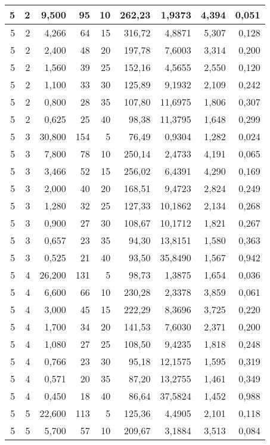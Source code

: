 \begin{tabular}{rrrrrrrrr}
5 & 2 & 9,500 & 95 & 10 & 262,23 & 1,9373 & 4,394 & 0,051 \\ \hline
5 & 2 & 4,266 & 64 & 15 & 316,72 & 4,8871 & 5,307 & 0,128 \\ \hline
5 & 2 & 2,400 & 48 & 20 & 197,78 & 7,6003 & 3,314 & 0,200 \\ \hline
5 & 2 & 1,560 & 39 & 25 & 152,16 & 4,5655 & 2,550 & 0,120 \\ \hline
5 & 2 & 1,100 & 33 & 30 & 125,89 & 9,1932 & 2,109 & 0,242 \\ \hline
5 & 2 & 0,800 & 28 & 35 & 107,80 & 11,6975 & 1,806 & 0,307 \\ \hline
5 & 2 & 0,625 & 25 & 40 & 98,38 & 11,3795 & 1,648 & 0,299 \\ \hline
5 & 3 & 30,800 & 154 & 5 & 76,49 & 0,9304 & 1,282 & 0,024 \\ \hline
5 & 3 & 7,800 & 78 & 10 & 250,14 & 2,4733 & 4,191 & 0,065 \\ \hline
5 & 3 & 3,466 & 52 & 15 & 256,02 & 6,4391 & 4,290 & 0,169 \\ \hline
5 & 3 & 2,000 & 40 & 20 & 168,51 & 9,4723 & 2,824 & 0,249 \\ \hline
5 & 3 & 1,280 & 32 & 25 & 127,33 & 10,1862 & 2,134 & 0,268 \\ \hline
5 & 3 & 0,900 & 27 & 30 & 108,67 & 10,1712 & 1,821 & 0,267 \\ \hline
5 & 3 & 0,657 & 23 & 35 & 94,30 & 13,8151 & 1,580 & 0,363 \\ \hline
5 & 3 & 0,525 & 21 & 40 & 93,50 & 35,8490 & 1,567 & 0,942 \\ \hline
5 & 4 & 26,200 & 131 & 5 & 98,73 & 1,3875 & 1,654 & 0,036 \\ \hline
5 & 4 & 6,600 & 66 & 10 & 230,28 & 2,3378 & 3,859 & 0,061 \\ \hline
5 & 4 & 3,000 & 45 & 15 & 222,29 & 8,3696 & 3,725 & 0,220 \\ \hline
5 & 4 & 1,700 & 34 & 20 & 141,53 & 7,6030 & 2,371 & 0,200 \\ \hline
5 & 4 & 1,080 & 27 & 25 & 108,50 & 9,4235 & 1,818 & 0,248 \\ \hline
5 & 4 & 0,766 & 23 & 30 & 95,18 & 12,1575 & 1,595 & 0,319 \\ \hline
5 & 4 & 0,571 & 20 & 35 & 87,20 & 13,2755 & 1,461 & 0,349 \\ \hline
5 & 4 & 0,450 & 18 & 40 & 86,64 & 37,5824 & 1,452 & 0,988 \\ \hline
5 & 5 & 22,600 & 113 & 5 & 125,36 & 4,4905 & 2,101 & 0,118 \\ \hline
5 & 5 & 5,700 & 57 & 10 & 209,67 & 3,1884 & 3,513 & 0,084 \\ \hline

\end{tabular}

